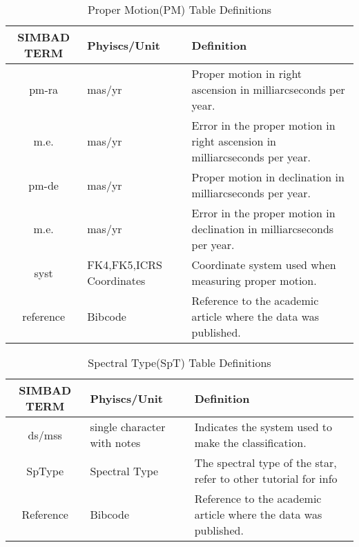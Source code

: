 \documentclass[12pt,oneside,a4paper,english]{article}
\begin{document}
    \begin{table}[H]
        \centering
        \caption{Proper Motion(PM) Table Definitions}
        \begin{tabular}{|c|p{3cm}|p{9cm}|}
        \centering
        \textbf{SIMBAD TERM} & \textbf{Phyiscs/Unit} & \textbf{Definition} \\ \hline \hline
        pm-ra & mas/yr & Proper motion in right ascension in milliarcseconds per year.  \\ \hline
        m.e. & mas/yr & Error in the proper motion in right ascension in milliarcseconds per year.  \\ \hline
        pm-de & mas/yr & Proper motion in declination in milliarcseconds per year.  \\ \hline
        m.e. & mas/yr & Error in the proper motion in declination in milliarcseconds per year.  \\ \hline
        syst & FK4,FK5,ICRS Coordinates & Coordinate system used when measuring proper motion. \\ \hline
        reference & Bibcode & Reference to the academic article where the data was published.  \\ \hline
        \end{tabular}
        \label{tab:table6}
    \end{table}
    \begin{table}[H]
        \centering
        \caption{Spectral Type(SpT) Table Definitions}
        \begin{tabular}{|c|p{3cm}|p{9cm}|}
        \centering
        \textbf{SIMBAD TERM} & \textbf{Phyiscs/Unit} & \textbf{Definition} \\ \hline \hline
        ds/mss & single character with notes & Indicates the system used to make the classification.  \\ \hline
        SpType & Spectral Type & The spectral type of the star, refer to other tutorial for info  \\ \hline
        Reference & Bibcode & Reference to the academic article where the data was published.  \\ \hline
        \end{tabular}
        \label{tab:table7}
    \end{table}
\end{document}
